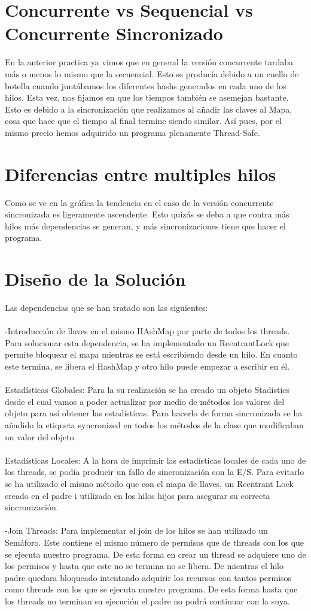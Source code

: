 \documentclass{article}
\begin{document}
\section{Concurrente vs Sequencial vs Concurrente Sincronizado}
En la anterior practica ya vimos que en general la versión concurrente tardaba más o menos lo mismo que la secuencial. Esto se producía debido a un cuello de botella cuando juntábamos los diferentes hashs generados en cada uno de los hilos. Esta vez, nos fijamos en que los tiempos también se asemejan bastante. Esto es debido a la sincronización que realizamos al añadir las claves al Mapa, cosa que hace que el tiempo al final termine siendo similar. Así pues, por el mismo precio hemos adquirido un programa plenamente Thread-Safe.

\section{Diferencias entre multiples hilos}
Como se ve en la gráfica la tendencia en el caso de la versión concurrente sincronizada es ligeramente ascendente. Esto quizás se deba a que contra más hilos más dependencias se generan, y más sincronizaciones tiene que hacer el programa.

\section{Diseño de la Solución}
Las dependencias que se han tratado son las siguientes:\\\\
-Introducción de llaves en el mismo HAshMap por parte de todos los threads. Para solucionar esta dependencia, se ha implementado un ReentrantLock que permite bloquear el mapa mientras se está escribiendo desde un hilo. En cuanto este termina, se libera el HashMap y otro hilo puede empezar a escribir en él.\\\\
Estadísticas Globales: Para la su realización se ha creado un objeto Stadistics desde el cual vamos a poder actualizar por medio de métodos los valores del objeto para así obtener las estadísticas. Para hacerlo de forma sincronizada se ha añadido la etiqueta syncronized en todos los métodos de la clase que modificaban un valor del objeto.\\\\
Estadísticas Locales: A la hora de imprimir las estadísticas locales de cada uno de los threads, se podía producir un fallo de sincronización con la E/S. Para evitarlo se ha utilizado el mismo método que con el mapa de llaves, un Reentrant Lock creado en el padre i utilizado en los hilos hijos para asegurar su correcta sincronización.\\\\
-Join Threads: Para implementar el join de los hilos se han utilizado un Semáforo. Este contiene el mismo número de permisos que de threads con los que se ejecuta nuestro programa. De esta forma en crear un thread se adquiere uno de los permisos y hasta que este no se termina no se libera. De mientras el hilo padre quedara bloqueado intentando adquirir los recursos con tantos permisos como threads con los que se ejecuta nuestro programa. De esta forma hasta que los threads no terminan su ejecución el padre no podrá continuar con la suya.
\end{document}
